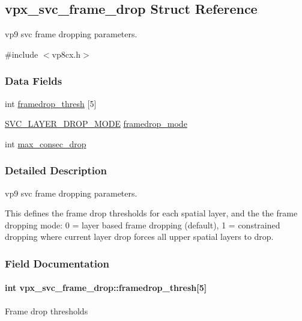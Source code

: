 \hypertarget{structvpx__svc__frame__drop}{}\subsection{vpx\+\_\+svc\+\_\+frame\+\_\+drop Struct Reference}
\label{structvpx__svc__frame__drop}


vp9 svc frame dropping parameters.  




{\ttfamily \#include $<$vp8cx.\+h$>$}

\subsubsection*{Data Fields}
\begin{DoxyCompactItemize}
\item 
int \hyperlink{structvpx__svc__frame__drop_a519c245794a2cd3c3d8e502d92ad1435}{framedrop\+\_\+thresh} \mbox{[}5\mbox{]}
\item 
\hyperlink{group__vp8__encoder_ga3205681fab504015432ce09e6e3fdce4}{S\+V\+C\+\_\+\+L\+A\+Y\+E\+R\+\_\+\+D\+R\+O\+P\+\_\+\+M\+O\+DE} \hyperlink{structvpx__svc__frame__drop_acdde4f09ba5bdaff7e6418bb15350a99}{framedrop\+\_\+mode}
\item 
int \hyperlink{structvpx__svc__frame__drop_aed72507d558a7133fe3493d501798f26}{max\+\_\+consec\+\_\+drop}
\end{DoxyCompactItemize}


\subsubsection{Detailed Description}
vp9 svc frame dropping parameters. 

This defines the frame drop thresholds for each spatial layer, and the the frame dropping mode\+: 0 = layer based frame dropping (default), 1 = constrained dropping where current layer drop forces all upper spatial layers to drop. 

\subsubsection{Field Documentation}
\paragraph[{\texorpdfstring{framedrop\+\_\+thresh}{framedrop_thresh}}]{\setlength{\rightskip}{0pt plus 5cm}int vpx\+\_\+svc\+\_\+frame\+\_\+drop\+::framedrop\+\_\+thresh\mbox{[}5\mbox{]}}\hypertarget{structvpx__svc__frame__drop_a519c245794a2cd3c3d8e502d92ad1435}{}\label{structvpx__svc__frame__drop_a519c245794a2cd3c3d8e502d92ad1435}
Frame drop thresholds 

